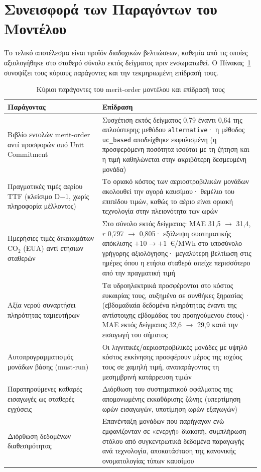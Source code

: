\section{Συνεισφορά των Παραγόντων του Μοντέλου}
\label{sec:driver-analysis}

Το τελικό αποτέλεσμα είναι προϊόν διαδοχικών βελτιώσεων, καθεμία από τις οποίες αξιολογήθηκε στο σταθερό σύνολο εκτός δείγματος πριν ενσωματωθεί. Ο Πίνακας~\ref{tab:driver-analysis} συνοψίζει τους κύριους παράγοντες και την τεκμηριωμένη επίδρασή τους.

\begin{table}[htbp]
\centering
\caption{Κύριοι παράγοντες του merit-order μοντέλου και επίδρασή τους}
\label{tab:driver-analysis}
\begin{tabular}{@{}p{5.2cm}p{8.3cm}@{}}
\toprule
\textbf{Παράγοντας} & \textbf{Επίδραση} \\
\midrule
Βιβλίο εντολών merit-order αντί προσφορών από Unit Commitment & Συσχέτιση εκτός δείγματος 0,79 έναντι 0,64 της απλούστερης μεθόδου \texttt{alternative}· η μέθοδος \texttt{uc\_based} αποδείχθηκε εκφυλισμένη (η προσφερόμενη ποσότητα ισούται με τη ζήτηση και η τιμή καθηλώνεται στην ακριβότερη δεσμευμένη μονάδα) \\
Πραγματικές τιμές αερίου TTF (κλείσιμο D$-$1, χωρίς πληροφορία μέλλοντος) & Το οριακό κόστος των αεριοστροβιλικών μονάδων ακολουθεί την αγορά καυσίμου· θεμέλιο του επιπέδου τιμών, καθώς το αέριο είναι οριακή τεχνολογία στην πλειονότητα των ωρών \\
Ημερήσιες τιμές δικαιωμάτων CO$_2$ (EUA) αντί ετήσιων σταθερών & Στο σύνολο εκτός δείγματος: MAE 31,5 $\to$ 31,4, $r$ 0,797 $\to$ 0,805· εξάλειψη συστηματικής απόκλισης $+10 \to +1$~€/MWh στο υποσύνολο γρήγορης αξιολόγησης· μεγαλύτερη βελτίωση στις ημέρες όπου η ετήσια σταθερά απείχε περισσότερο από την πραγματική τιμή \\
Αξία νερού συναρτήσει πληρότητας ταμιευτήρων & Τα υδροηλεκτρικά προσφέρονται στο κόστος ευκαιρίας τους, αυξημένο σε συνθήκες ξηρασίας (εβδομαδιαία δεδομένα πληρότητας έναντι της αντίστοιχης εβδομάδας του προηγούμενου έτους)· MAE εκτός δείγματος 32,6 $\to$ 29,9 κατά την εισαγωγή του σήματος \\
Αυτοπρογραμματισμός μονάδων βάσης (must-run) & Οι λιγνιτικές/αεριοστροβιλικές μονάδες με υψηλό κόστος εκκίνησης προσφέρουν μέρος της ισχύος τους σε χαμηλή τιμή, αναπαράγοντας τη μεσημβρινή κατάρρευση τιμών \\
Παρατηρούμενες καθαρές εισαγωγές ως σταθερές εγχύσεις & Διόρθωση του συστηματικού σφάλματος της απομονωμένης εκκαθάρισης ζώνης (υπερτίμηση ωρών εισαγωγών, υποτίμηση ωρών εξαγωγών) \\
Διόρθωση δεδομένων διαθεσιμότητας & Επανένταξη μονάδων που παρήγαγαν ενώ εμφανίζονταν σε «ενεργή» διακοπή, συμπλήρωση στόλου από συγκεντρωτικά δεδομένα παραγωγής ανά τεχνολογία, αποκατάσταση της κανονικής ονοματολογίας τύπων καυσίμου \\
\bottomrule
\end{tabular}
\end{table}


